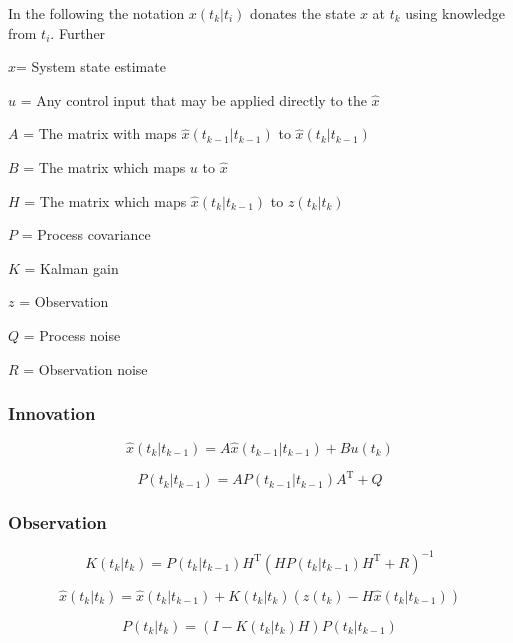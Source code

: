 \documentclass[a4paper]{report}
\numberwithin{equation}{chapter}
\begin{document}
\bigskip

In the following the notation $x \left( t_k|t_i \right)$ donates the state $x$ at $t_k$ using knowledge from $t_i$. Further

$\hat{x}$= System state estimate

$u$ = Any control input that may be applied directly to the $\hat{x}$

$A$ = The matrix with maps $\hat{x} \left( t_{k - 1}|t_{k - 1} \right)$ to $\hat{x} \left( t_k|t_{k - 1} \right)$

$B$ = The matrix which maps $u$ to $\hat{x}$

$H$ = The matrix which maps $\hat{x} \left( t_k|t_{k - 1} \right)$ to $z \left( t_k|t_k \right)$

$P$ = Process covariance

$K$ = Kalman gain

$z$ = Observation

$Q$ = Process noise

$R$ = Observation noise

\subsubsection[Innovation]{Innovation}

\begin{equation}
\hat{x} \left( t_k|t_{k-1} \right) = A\hat{x} \left( t_{k-1}|t_{k-1} \right) + Bu \left( t_k \right)
\end{equation}

\begin{equation}
P \left( t_k|t_{k-1} \right) = AP \left( t_{k-1}|t_{k-1} \right) A^{\mathrm{T}} + Q
\end{equation}

\subsubsection[Observation]{Observation}

\begin{equation}
K \left( t_k|t_k \right) = P \left( t_k|t_{k-1} \right) H^{\mathrm{T}} \left( HP \left( t_k|t_{k-1} \right) H^{\mathrm{T}} + R \right) ^{-1}
\end{equation}

\begin{equation}
\hat{x} \left( t_k|t_k \right) = \hat{x} \left( t_k|t_{k-1} \right) + K \left( t_k|t_k \right) \left( z \left(t_k \right) - H\hat{x} \left( t_k|t_{k-1} \right) \right)
\end{equation}

\begin{equation}
P \left( t_k|t_k \right) = \left( I - K \left( t_k|t_k \right)H \right) P \left( t_k|t_{k-1} \right)
\end{equation}
\end{document}
